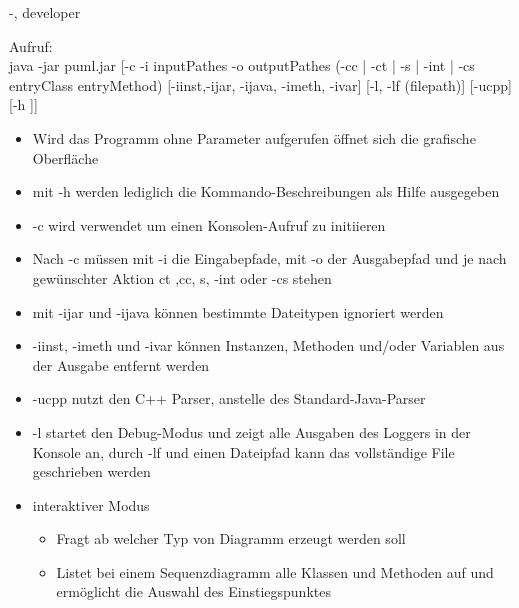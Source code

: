 \documentclass[twoside]{report}
\begin{document}
\begin{shownto}{-, developer}

Aufruf:\\
java -jar puml.jar [-c -i inputPathes -o outputPathes (-cc | -ct | -s | -int | -cs entryClass entryMethod) [-iinst,-ijar, -ijava, -imeth, -ivar] [-l, -lf (filepath)] [-ucpp] [-h ]]

\begin{itemize}
\item Wird das Programm ohne Parameter aufgerufen öffnet sich die grafische Oberfläche
\item mit -h werden lediglich die Kommando-Beschreibungen als Hilfe ausgegeben
\item -c wird verwendet um einen Konsolen-Aufruf zu initiieren
\item  Nach -c müssen mit -i die Eingabepfade, mit -o der Ausgabepfad und je nach gewünschter Aktion ct ,cc, s, -int oder -cs stehen
\item mit -ijar und -ijava können bestimmte Dateitypen ignoriert werden
\item -iinst, -imeth und -ivar können Instanzen, Methoden und/oder Variablen aus der Ausgabe entfernt werden
\item -ucpp nutzt den C++ Parser, anstelle des Standard-Java-Parser 
\item -l startet den Debug-Modus und zeigt alle Ausgaben des Loggers in der Konsole an, durch -lf und einen Dateipfad kann das vollständige File geschrieben werden
\item interaktiver Modus
\begin{itemize}
\item Fragt ab welcher Typ von Diagramm erzeugt werden soll
\item Listet bei einem Sequenzdiagramm alle Klassen und Methoden auf und ermöglicht die Auswahl des Einstiegspunktes
\end{itemize}
\end{itemize}


\end{shownto}
\end{document}

